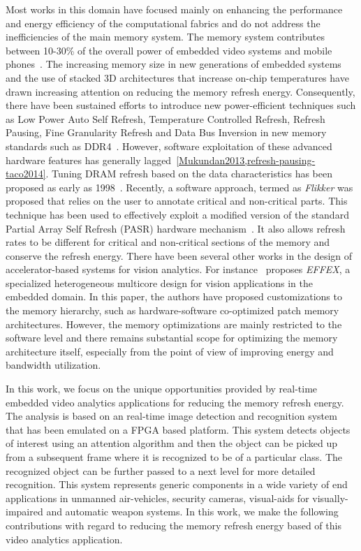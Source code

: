 Most works in this domain have focused mainly on enhancing the performance and energy efficiency of the computational fabrics and do not address the inefficiencies of the main memory system. The memory system contributes between 10-30\% of the overall power of embedded video systems and mobile phones~\cite{CarrollAaronHeiser2010}. 
The increasing memory size in new generations of embedded systems and the use of stacked 3D architectures that increase on-chip temperatures have drawn increasing attention on reducing the memory refresh energy. Consequently, there have been sustained efforts to introduce new power-efficient techniques such as Low Power Auto Self Refresh, Temperature Controlled Refresh, Refresh Pausing, Fine Granularity Refresh and Data Bus Inversion in new memory standards such as DDR4~\cite{jedec-sdram-standards}.  However, software exploitation of these advanced hardware features has generally lagged~\ref{Mukundan2013,refresh-pausing-taco2014}. 
Tuning DRAM refresh based on the data characteristics has been proposed as early as 1998~\cite{islped98}. Recently, a software approach, termed as \emph{Flikker} was proposed that relies on the user to annotate critical and non-critical parts. This technique has been used to effectively exploit a modified version of the standard Partial Array Self Refresh (PASR) hardware mechanism~\cite{Liu2011}. It also allows refresh rates to be different for critical and non-critical sections of the memory and conserve the refresh energy. 
There have been several other works in the design of accelerator-based systems for vision analytics. For instance~\cite{Effex} proposes \emph{EFFEX}, a specialized heterogeneous multicore design for vision applications in the embedded domain. In this paper, the authors have proposed customizations to the memory hierarchy, such as hardware-software co-optimized patch memory architectures. However, the memory optimizations are mainly restricted to the software level and there remains substantial scope for optimizing the memory architecture itself, especially from the point of view of improving energy and bandwidth utilization.

In this work, we focus on the unique opportunities provided by real-time embedded video analytics applications for reducing the memory refresh energy. The analysis is based on an real-time image detection and recognition system that has been emulated on a FPGA based platform. This system detects objects of interest using an attention algorithm and then the object can be picked up from a subsequent frame where it is recognized to be of a particular class. The recognized object can be further passed to a next level for more detailed recognition. This system represents generic components in a wide variety of end applications in unmanned air-vehicles, security cameras, visual-aids for visually-impaired and automatic weapon systems. In this work, we make the following contributions with regard to reducing the memory refresh energy based of this video analytics application.

